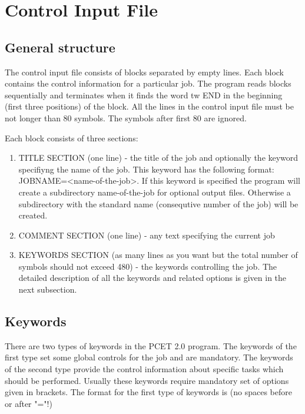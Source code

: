 \documentclass[oneside,11pt,openany]{book}
\newcommand{\tw}{\ttfamily}
\begin{document}
\section{Control Input File}

\subsection{General structure}
The control input file consists of blocks separated by
empty lines. Each block contains the control information
for a particular job. The program reads blocks sequentially
and terminates when it finds the word {tw END} in the
beginning (first three positions) of the block. All the
lines in the control input file must be not longer
than 80 symbols. The symbols after first 80 are ignored.

Each block consists of three sections:
\begin{enumerate}
\item TITLE SECTION (one line) -
      the title of the job and optionally the keyword
      specifiyng the name of the job. This keyword
      has the following format: {\tw JOBNAME=<name-of-the-job>}.
      If this keyword is specified the program will
      create a subdirectory {\tw name-of-the-job}
      for optional output files. Otherwise a subdirectory
      with the standard name (consequtive number of the job)
      will be created.

\item COMMENT SECTION (one line) -
      any text specifying the current job

\item KEYWORDS SECTION (as many lines as you want but the total
      number of symbols should not exceed 480) - the keywords
      controlling the job. The detailed description of all
      the keywords and related options is given in the next
      subsection.

\end{enumerate}

\subsection{Keywords}
There are two types of keywords in the PCET 2.0 program. The keywords
of the first type set some global controls for the job and are
mandatory. The keywords of the second type provide the control
information about specific tasks which should be performed.
Usually these keywords require mandatory set of options given
in brackets. The format for the first type of keywords is
(no spaces before or after "="!)
\end{document}
